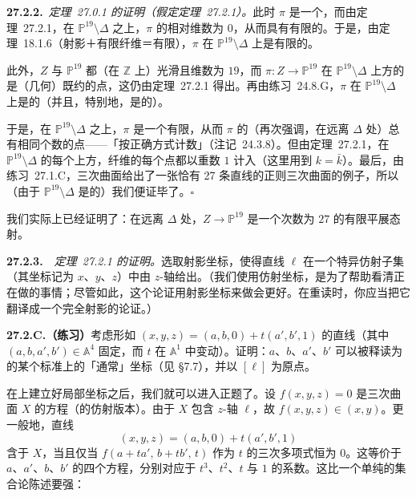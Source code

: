 \textbf{27.2.2.}\ \emph{\mbox{定理~27.0.1} 的证明（假定\mbox{定理~27.2.1}）。}\quad 此时 $\pi$ 是一个\trProjective{}\trMorphism，而由\mbox{定理~27.2.1}，在 $\mathbb{P}^{19}\setminus\Delta$ 之上，$\pi$ 的相对维数为 $0$，从而具有有限的\trFiber。于是，由\mbox{定理~18.1.6}（射影＋有限纤维＝有限），$\pi$ 在 $\mathbb{P}^{19}\setminus\Delta$ 上是有限的。

此外，$Z$ 与 $\mathbb{P}^{19}$ 都（在 $\mathbb{Z}$ 上）光滑且维数为 $19$，而 $\pi\colon Z\to\mathbb{P}^{19}$ 在 $\mathbb{P}^{19}\setminus\Delta$ 上方的\trFiber{}是（几何）既约的点，这仍由\mbox{定理~27.2.1} 得出。再由\mbox{练习~24.8.G}，$\pi$ 在 $\mathbb{P}^{19}\setminus\Delta$ 上是\trEtale{}的（并且，特别地，是\trFlat{}的）。

于是，在 $\mathbb{P}^{19}\setminus\Delta$ 之上，$\pi$ 是一个有限\trFlat{}\trMorphism，从而 $\pi$ 的\trFiber（再次强调，在远离 $\Delta$ 处）总有相同个数的点——「按正确方式计数」（\mbox{注记~24.3.8}）。但由\mbox{定理~27.2.1}，在 $\mathbb{P}^{19}\setminus\Delta$ 的每个\trClosedPoint{}上方，纤维的每个点都以重数 $1$ 计入（这里用到 $k=\bar{k}$）。最后，由\mbox{练习~27.1.C}，\trFermat{}三次曲面给出了一张恰有 27 条直线的正则三次曲面的例子，所以（由于 $\mathbb{P}^{19}\setminus\Delta$ 是\trConnected{}的）我们便证毕了。\hfill$\square$

我们实际上已经证明了：在远离 $\Delta$ 处，$Z\to\mathbb{P}^{19}$ 是一个次数为 $27$ 的有限平展态射。

\textbf{27.2.3.}\ \hard\ \emph{\mbox{定理~27.2.1} 的证明。}\quad 选取射影坐标，使得直线 $\ell$ 在一个特异仿射子集（其坐标记为 $x$、$y$、$z$）中由 $z$-轴给出。（我们使用仿射坐标，是为了帮助看清正在做的事情；尽管如此，这个论证用射影坐标来做会更好。在重读时，你应当把它翻译成一个完全射影的论证。）

\textbf{27.2.C.（练习）}\quad 考虑形如 $(x,y,z)=(a,b,0)+t(a',b',1)$ 的直线（其中 $(a,b,a',b')\in\mathbb{A}^{4}$ 固定，而 $t$ 在 $\mathbb{A}^{1}$ 中变动）。证明：$a$、$b$、$a'$、$b'$ 可以被释读为\trGrassmannian{}的某个标准\trOpenSubset{}上的「通常」坐标（见 \S7.7），并以 $[\ell]$ 为原点。

在\trModuliSpace{}上建立好局部坐标之后，我们就可以进入正题了。设 $f(x,y,z)=0$ 是三次曲面 $X$ 的方程（的仿射版本）。由于 $X$ 包含 $z$-轴 $\ell$，故 $f(x,y,z)\in(x,y)$。更一般地，直线
\[
\tag{27.2.3.1}\label{eq:nearby-line-param}
(x,y,z)=(a,b,0)+t(a',b',1)
\]
含于 $X$，当且仅当 $f(a+ta',\,b+tb',\,t)$ 作为 $t$ 的三次多项式恒为 $0$。这等价于 $a$、$a'$、$b$、$b'$ 的四个方程，分别对应于 $t^{3}$、$t^{2}$、$t$ 与 $1$ 的系数。这比一个单纯的集合论陈述要强：

